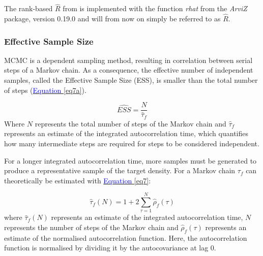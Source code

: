 The rank-based $\hat{R}$ from \citep{vehtari2021rank} is implemented with the function \textit{rhat} from the \textit{ArviZ} package, version 0.19.0 \citep{kumar2019arviz} and will from now on simply be referred to as $\hat{R}$. 

\subsubsection{Effective Sample Size}
MCMC is a dependent sampling method, resulting in correlation between serial steps of a Markov chain. As a consequence, the effective number of independent samples, called the Effective Sample Size (ESS), is smaller than the total number of steps (\hyperref[eq7a]{\textcolor{blue}{Equation }\ref{eq7a}}).

\begin{equation}\label{eq7a}
    \widehat{ESS} = \frac{N}{\hat{\tau}_f}
\end{equation}
Where $N$ represents the total number of steps of the Markov chain and $\hat{\tau}_f$ represents an estimate of the integrated autocorrelation time, which quantifies how many intermediate steps are required for steps to be considered independent. 

For a longer integrated autocorrelation time, more samples must be generated to produce a representative sample of the target density. For a Markov chain $\tau_f$ can theoretically be estimated with \hyperref[eq7]{\textcolor{blue}{Equation} \ref{eq7}}:

\begin{equation}\label{eq7}
    \hat{\tau}_f (N) = 1 + 2 \sum_{\tau=1}^{N} \hat{\rho}_f (\tau) 
\end{equation} 
where $\hat{\tau}_f (N)$ represents an estimate of the integrated autocorrelation time, $N$ represents the number of steps of the Markov chain and $\hat{\rho}_f (\tau)$ represents an estimate of the normalised autocorrelation function. Here, the autocorrelation function is normalised by dividing it by the autocovariance at lag 0.

